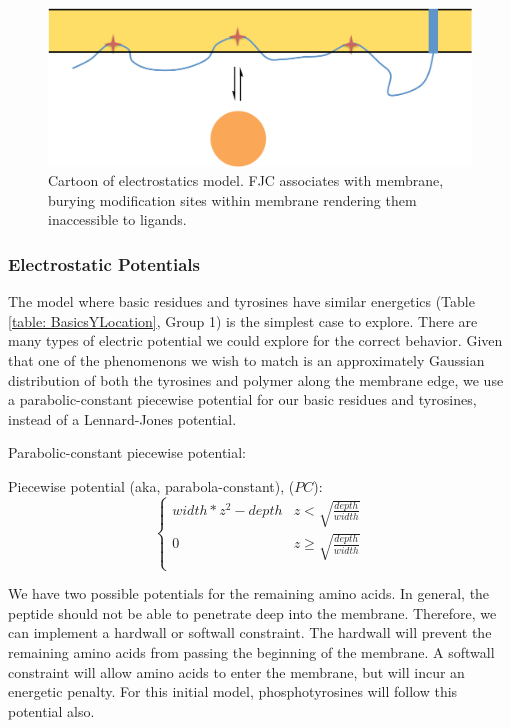 \documentclass[../../AdvancementSummary.tex]{subfiles}
\begin{document}
\begin{figure}[H]
\begin{center}
    \includegraphics[width=0.7\linewidth]{ElectrostaticsDiagram.pdf}
    \caption{Cartoon of electrostatics model. FJC associates with membrane, burying modification sites within membrane rendering them inaccessible to ligands.\label{fig: ElectrostaticsCartoon}}
    \end{center}
\end{figure}


\subsubsection{Electrostatic Potentials}

The model where basic residues and tyrosines have similar energetics (Table \ref{table: BasicsYLocation}, Group 1) is the simplest case to explore. There are many types of electric potential we could explore for the correct behavior.  Given that one of the phenomenons we wish to match is an approximately Gaussian distribution of both the tyrosines and polymer along the membrane edge, we use a parabolic-constant piecewise potential for our basic residues and tyrosines, instead of a Lennard-Jones potential. 

Parabolic-constant piecewise potential:

Piecewise potential (aka, parabola-constant), ($PC$):
\begin{equation}\label{eq: parabolaconstant}
\begin{cases}
width*z^2-depth 	& z<\sqrt{\frac{depth}{width}}\\
0 & z \geq \sqrt{\frac{depth}{width}} \\
\end{cases}
\end{equation}

We have two possible potentials for the remaining amino acids.  In general, the peptide should not be able to penetrate deep into the membrane. Therefore, we can implement a hardwall or softwall constraint. The hardwall will prevent the remaining amino acids from passing the beginning of the membrane. A softwall constraint will allow amino acids to enter the membrane, but will incur an energetic penalty. For this initial model, phosphotyrosines will follow this potential also.
\end{document}
